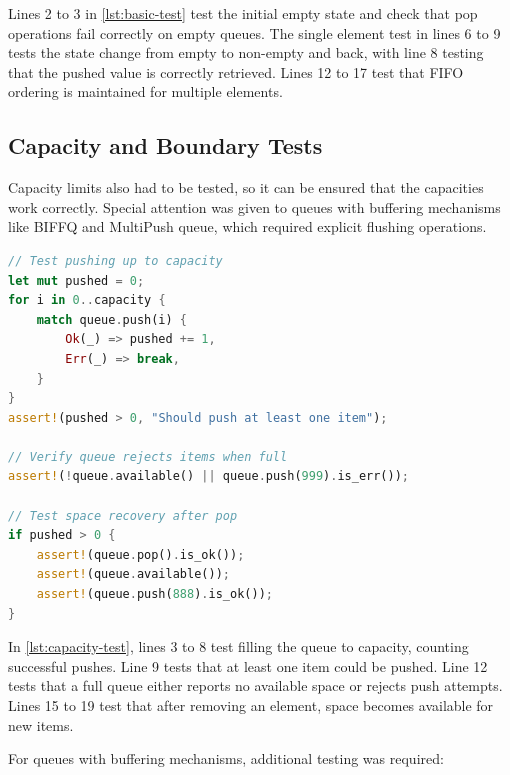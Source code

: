 Lines 2 to 3 in \cref{lst:basic-test} test the initial empty state and check that pop operations fail correctly on empty queues. The single element test in lines 6 to 9 tests the state change from empty to non-empty and back, with line 8 testing that the pushed value is correctly retrieved. Lines 12 to 17 test that FIFO ordering is maintained for multiple elements.

\subsection{Capacity and Boundary Tests}
Capacity limits also had to be tested, so it can be ensured that the capacities work correctly. Special attention was given to queues with buffering mechanisms like \ac{BIFFQ} and MultiPush queue, which required explicit flushing operations.

\begin{lstlisting}[language=Rust, style=boxed, caption={Capacity limit test pattern}, label={lst:capacity-test}]
// Test pushing up to capacity
let mut pushed = 0;
for i in 0..capacity {
    match queue.push(i) {
        Ok(_) => pushed += 1,
        Err(_) => break,
    }
}
assert!(pushed > 0, "Should push at least one item");

// Verify queue rejects items when full
assert!(!queue.available() || queue.push(999).is_err());

// Test space recovery after pop
if pushed > 0 {
    assert!(queue.pop().is_ok());
    assert!(queue.available());
    assert!(queue.push(888).is_ok());
}
\end{lstlisting}

In \cref{lst:capacity-test}, lines 3 to 8 test filling the queue to capacity, counting successful pushes. Line 9 tests that at least one item could be pushed. Line 12 tests that a full queue either reports no available space or rejects push attempts. Lines 15 to 19 test that after removing an element, space becomes available for new items.

For queues with buffering mechanisms, additional testing was required:

